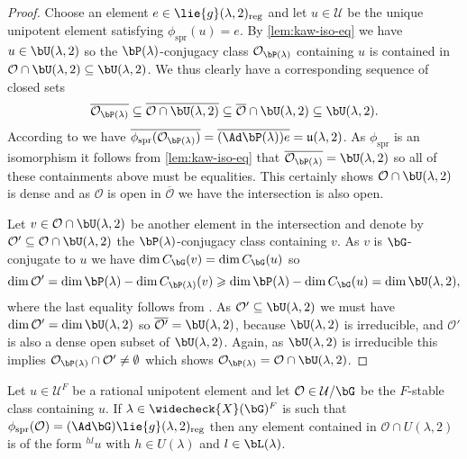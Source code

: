 \documentclass[eqthmnum, nocolour]{jt-calcs}
\begin{document}
\begin{proof}
Choose an element $e \in \lie{g}(\lambda,2)_{\mathrm{reg}}$ and let $u \in \mathcal{U}$ be the unique unipotent element satisfying $\phi_{\mathrm{spr}}(u) = e$. By \cref{lem:kaw-iso-eq} we have $u \in \bU(\lambda,2)$ so the $\bP(\lambda)$-conjugacy class $\mathcal{O}_{\bP(\lambda)}$ containing $u$ is contained in $\mathcal{O} \cap\bU(\lambda,2) \subseteq \bU(\lambda,2)$. We thus clearly have a corresponding sequence of closed sets
\begin{equation*}
\overline{\mathcal{O}_{\bP(\lambda)}} \subseteq \overline{\mathcal{O}\cap \bU(\lambda,2)} \subseteq \overline{\mathcal{O}}\cap \bU(\lambda,2) \subseteq \bU(\lambda,2).
\end{equation*}
According to \cite[3.22(ii.b)]{taylor:2016:GGGRs-small-characteristics} we have $\overline{\phi_{\mathrm{spr}}(\mathcal{O}_{\bP(\lambda)})} = \overline{(\Ad\bP(\lambda))e} = \mathfrak{u}(\lambda,2)$. As $\phi_{\mathrm{spr}}$ is an isomorphism it follows from \cref{lem:kaw-iso-eq} that $\overline{\mathcal{O}_{\bP(\lambda)}} = \bU(\lambda,2)$ so all of these containments above must be equalities. This certainly shows $\mathcal{O} \cap \bU(\lambda,2)$ is dense and as $\mathcal{O}$ is open in $\overline{\mathcal{O}}$ we have the intersection is also open.

Let $v \in \mathcal{O} \cap\bU(\lambda,2)$ be another element in the intersection and denote by $\mathcal{O}' \subseteq \mathcal{O} \cap\bU(\lambda,2)$ the $\bP(\lambda)$-conjugacy class containing $v$. As $v$ is $\bG$-conjugate to $u$ we have $\dim C_{\bG}(v) = \dim C_{\bG}(u)$ so
\begin{equation*}
\dim\mathcal{O}' = \dim\bP(\lambda) - \dim C_{\bP(\lambda)}(v) \geqslant \dim\bP(\lambda) - \dim C_{\bG}(u) = \dim\bU(\lambda,2),
\end{equation*}
where the last equality follows from \cite[3.22(ii)]{taylor:2016:GGGRs-small-characteristics}. As $\mathcal{O}' \subseteq \bU(\lambda,2)$ we must have $\dim \mathcal{O}' = \dim\bU(\lambda,2)$ so $\overline{\mathcal{O}'} = \bU(\lambda,2)$, because $\bU(\lambda,2)$ is irreducible, and $\mathcal{O}'$ is also a dense open subset of $\bU(\lambda,2)$. Again, as $\bU(\lambda,2)$ is irreducible this implies $\mathcal{O}_{\bP(\lambda)} \cap \mathcal{O}' \neq \emptyset$ which shows $\mathcal{O}_{\bP(\lambda)} = \mathcal{O} \cap \bU(\lambda,2)$.
\end{proof}

\begin{cor}\label{cor:rat-P-conj}
Let $u \in \mathcal{U}^F$ be a rational unipotent element and let $\mathcal{O} \in \mathcal{U}/\bG$ be the $F$-stable class containing $u$. If $\lambda \in \widecheck{X}(\bG)^F$ is such that $\phi_{\mathrm{spr}}(\mathcal{O}) = (\Ad\bG)\lie{g}(\lambda,2)_{\mathrm{reg}}$ then any element contained in $\mathcal{O}\cap U(\lambda,2)$ is of the form ${}^{hl}u$ with $h \in U(\lambda)$ and $l \in \bL(\lambda)$.
\end{cor}
\end{document}
